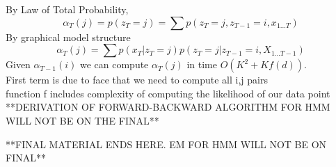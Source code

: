 \documentclass[11pt,psfig]{article}
\begin{document}
By Law of Total Probability, 
\[
\alpha_T(j) = p(z_T=j) = \sum{p(z_T=j,z_{T-1} = i, x_{1...T}) }
\]
By graphical model structure
\[
\alpha_T(j) = \sum{p(x_T|z_T=j) p(z_T=j|z_{T-1} = i,X_{1...T-1}) }
\]
Given $\alpha_{T-1}(i)$ we can compute $\alpha_T(j)$ in time $O(K^2 + K f(d))$. \\
First term is due to face that we need to compute all i,j pairs\\
function f includes complexity of computing the likelihood of our data point\\

**DERIVATION OF FORWARD-BACKWARD ALGORITHM FOR HMM WILL NOT BE ON THE FINAL**

**FINAL MATERIAL ENDS HERE. EM FOR HMM WILL NOT BE ON FINAL**
\end{document}
